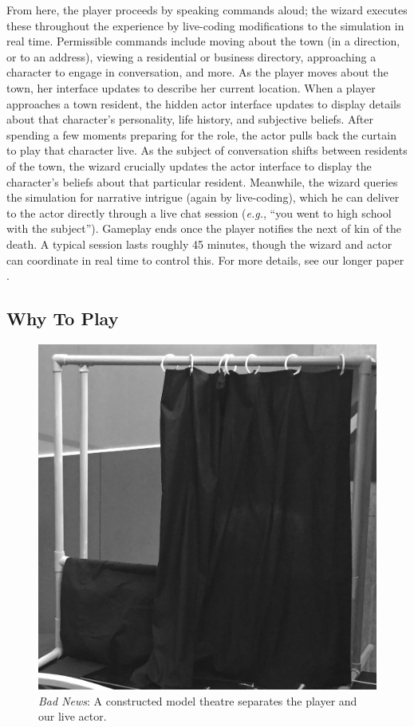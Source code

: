\documentclass[letterpaper]{article}
\begin{document}
From here, the player proceeds by speaking commands aloud; the wizard executes these throughout the experience by live-coding modifications to the simulation in real time. Permissible commands include moving about the town (in a direction, or to an address), viewing a residential or business directory, approaching a character to engage in conversation, and more. As the player moves about the town, her interface updates to describe her current location. When a player approaches a town resident, the hidden actor interface updates to display details about that character's personality, life history, and subjective beliefs. After spending a few moments preparing for the role, the actor pulls back the curtain to play that character live. As the subject of conversation shifts between residents of the town, the wizard crucially updates the actor interface to display the character's beliefs about that particular resident. Meanwhile, the wizard queries the simulation for narrative intrigue (again by live-coding), which he can deliver to the actor directly through a live chat session (\textit{e.g.}, ``you went to high school with the subject''). Gameplay ends once the player notifies the next of kin of the death. A typical session lasts roughly 45 minutes, though the wizard and actor can coordinate in real time to control this. For more details, see our longer paper \cite{samuel2016bad}.


\subsection{Why To Play}


\begin{figure}[t]
  \centering
  \includegraphics[width=0.64\columnwidth]{images/bad_news-the_puppet_theatre}
  \caption{\textit{Bad News}: A constructed model theatre separates the player and our live actor.}
  \label{fig:bn-model_theatre}
\end{figure}
\end{document}
